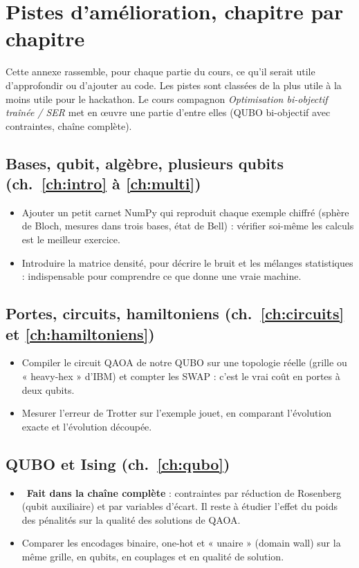 \chapter{Pistes d'amélioration, chapitre par chapitre}\label{annexe:pistes}

Cette annexe rassemble, pour chaque partie du cours, ce qu'il serait utile d'approfondir ou d'ajouter au code. Les pistes sont classées de la plus utile à la moins utile pour le hackathon. Le cours compagnon \emph{Optimisation bi-objectif traînée / SER} met en œuvre une partie d'entre elles (QUBO bi-objectif avec contraintes, chaîne complète).

\section*{Bases, qubit, algèbre, plusieurs qubits (ch.~\ref{ch:intro} à \ref{ch:multi})}
\begin{itemize}
\item Ajouter un petit carnet NumPy qui reproduit chaque exemple chiffré (sphère de Bloch, mesures dans trois bases, état de Bell) : vérifier soi-même les calculs est le meilleur exercice.
\item Introduire la matrice densité, pour décrire le bruit et les mélanges statistiques : indispensable pour comprendre ce que donne une vraie machine.
\end{itemize}

\section*{Portes, circuits, hamiltoniens (ch.~\ref{ch:circuits} et \ref{ch:hamiltoniens})}
\begin{itemize}
\item Compiler le circuit QAOA de notre QUBO sur une topologie réelle (grille ou « heavy-hex » d'IBM) et compter les SWAP : c'est le vrai coût en portes à deux qubits.
\item Mesurer l'erreur de Trotter sur l'exemple jouet, en comparant l'évolution exacte et l'évolution découpée.
\end{itemize}

\section*{QUBO et Ising (ch.~\ref{ch:qubo})}
\begin{itemize}
\item {}~\textbf{Fait dans la chaîne complète} : contraintes par réduction de Rosenberg (qubit auxiliaire) et par variables d'écart. Il reste à étudier l'effet du poids des pénalités sur la qualité des solutions de QAOA.
\item Comparer les encodages binaire, one-hot et « unaire » (domain wall) sur la même grille, en qubits, en couplages et en qualité de solution.
\end{itemize}

